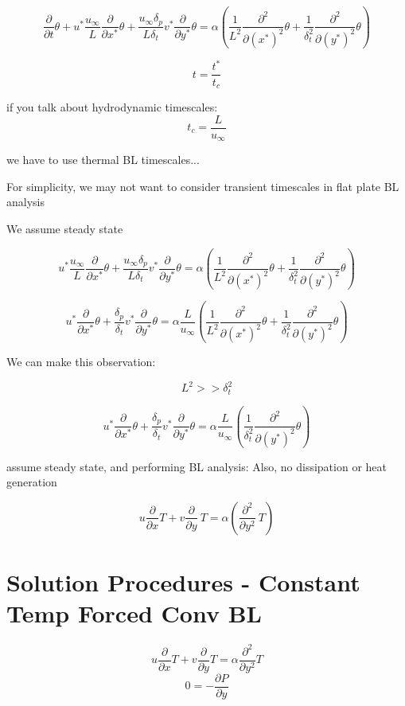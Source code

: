\documentclass[11pt]{article}
\begin{document}
$$\frac{\partial }{\partial t} \theta + u^* \frac{u_\infty}{L} \frac{\partial}{\partial x^*} \theta + \frac{u_\infty \delta_p}{L \delta_t} v^* \frac{\partial }{\partial y^*} \theta   = \alpha ( \frac{1}{L^2} \frac{\partial^2}{\partial (x^*)^2} \theta  +  \frac{1}{\delta_t^2} \frac{\partial^2 }{\partial (y^*)^2} \theta ) $$ 

$$t = \frac{t^*}{t_c}$$

if you talk about hydrodynamic timescales:
$$t_c = \frac{L}{u_\infty}$$

we have to use thermal BL timescales...

For simplicity, we may not want to consider transient timescales in flat plate BL analysis

We assume steady state

$$u^* \frac{u_\infty}{L} \frac{\partial}{\partial x^*} \theta + \frac{u_\infty \delta_p}{L \delta_t} v^* \frac{\partial }{\partial y^*} \theta   = \alpha ( \frac{1}{L^2} \frac{\partial^2}{\partial (x^*)^2} \theta  +  \frac{1}{\delta_t^2} \frac{\partial^2 }{\partial (y^*)^2} \theta ) $$ 

$$u^* \frac{\partial}{\partial x^*} \theta + \frac{\delta_p}{ \delta_t} v^* \frac{\partial }{\partial y^*} \theta   = \alpha \frac{L}{u_\infty} ( \frac{1}{L^2} \frac{\partial^2}{\partial (x^*)^2} \theta  +  \frac{1}{\delta_t^2} \frac{\partial^2 }{\partial (y^*)^2} \theta ) $$ 

We can make this observation:

$$L^2 >> \delta_t^2$$

$$u^* \frac{\partial}{\partial x^*} \theta + \frac{\delta_p}{ \delta_t} v^* \frac{\partial }{\partial y^*} \theta   = \alpha \frac{L}{u_\infty} (\frac{1}{\delta_t^2} \frac{\partial^2 }{\partial (y^*)^2} \theta ) $$ 

assume steady state, and performing BL analysis:
Also, no dissipation or heat generation

$$ u \frac{\partial}{\partial x} T + v \frac{\partial }{\partial y} \ T  = \alpha (\frac{\partial^2 }{\partial y^2} \ T ) $$ 

\part{Solution Procedures - Constant Temp Forced Conv BL}


$$ u \frac{\partial}{\partial x} T + v \frac{\partial }{\partial y} T  = \alpha \frac{\partial^2 }{\partial y^2}T  $$ 
$$0 = - \frac{\partial P}{\partial y} $$
\end{document}
